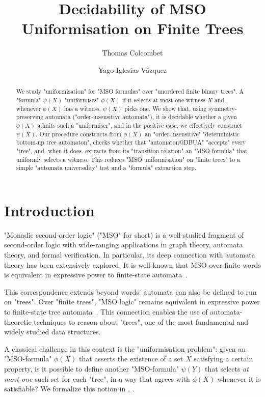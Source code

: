 \documentclass[a4paper,UKenglish,cleveref, autoref, thm-restate]{lipics-v2021}
\title{Decidability of MSO Uniformisation on Finite Trees}
\author{Thomas Colcombet}
	{CNRS, IRIF, Universit\'e Paris Diderot, France}
	{thomas.colcombet@irif.fr}
	{https://orcid.org/0000-0001-6529-6963}
	{}
\author{Yago Iglesias Vázquez}{Universit\'e Paris Diderot, France}{me@yagoiglesias.fr}{}{}
\begin{document}
\maketitle

\begin{abstract}
	We study "uniformisation" for "MSO formulas" over "unordered finite binary trees". A "formula" $\psi(X)$ "uniformises" $\phi(X)$
	if it selects at most one witness $X$ and, whenever $\phi(X)$ has a witness, $\psi(X)$ picks one. We show that,
	using symmetry-preserving automata ("order-insensitive automata"), it is decidable whether a
	given $\phi(X)$ admits such a "uniformiser", and in the positive case, we effectively construct $\psi(X)$. Our procedure constructs from $\phi(X)$
	an "order-insensitive" "deterministic bottom-up tree automaton", checks whether that "automaton@DBUA" "accepts" every "tree", and, when
	it does, extracts from its "transition relation" an "MSO-formula" that uniformly selects a witness. This reduces "MSO uniformisation"
	on "finite trees" to a simple "automata universality" test and a "formula" extraction step.
\end{abstract}

\section{Introduction}

"Monadic second‐order logic" ("MSO" for short) is a well-studied fragment of second-order logic with wide-ranging applications in graph theory, automata theory, and formal verification.
In particular, its deep connection with automata theory has been extensively explored. It is well known that MSO over finite words is equivalent in expressive power to
finite-state automata~\cite{Buchi60}.

This correspondence extends beyond words: automata can also be defined to run on "trees". Over "finite trees", "MSO logic" remains equivalent in expressive power to finite-state
tree automata~\cite{TW68, Don70}. This connection enables the use of automata-theoretic techniques to reason about "trees", one of the most fundamental and widely studied data
structures.

A classical challenge in this context is the "uniformisation problem": given an "MSO-formula" $\phi(X)$ that asserts the existence of a set $X$ satisfying a certain property,
is it possible to define another "MSO-formula" $\psi(Y)$ that selects \emph{at most one} such set for each "tree", in a way that agrees with $\phi(X)$ whenever it is satisfiable? We
formalize this notion in , .
\end{document}
